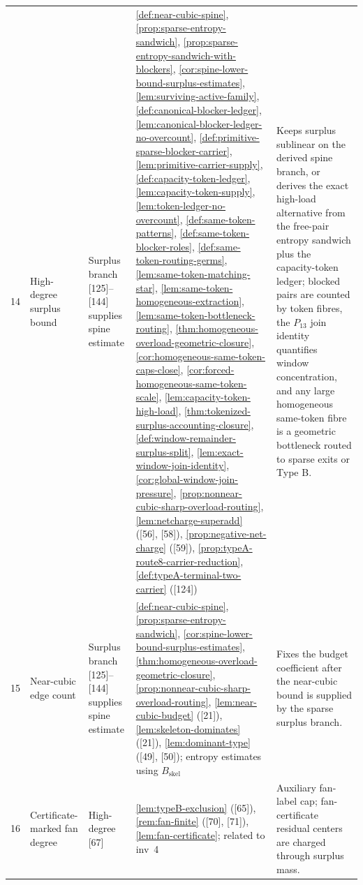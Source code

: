\documentclass[11pt]{article}
\begin{document}
{\begin{longtable}{C{0.032\textwidth} L{0.145\textwidth} L{0.105\textwidth} L{0.50\textwidth} L{0.155\textwidth}}
14 & High-degree surplus bound & Surplus branch {[125]--[144]} supplies spine estimate & \cref{def:near-cubic-spine}, \cref{prop:sparse-entropy-sandwich}, \cref{prop:sparse-entropy-sandwich-with-blockers}, \cref{cor:spine-lower-bound-surplus-estimates}, \cref{lem:surviving-active-family}, \cref{def:canonical-blocker-ledger}, \cref{lem:canonical-blocker-ledger-no-overcount}, \cref{def:primitive-sparse-blocker-carrier}, \cref{lem:primitive-carrier-supply}, \cref{def:capacity-token-ledger}, \cref{lem:capacity-token-supply}, \cref{lem:token-ledger-no-overcount}, \cref{def:same-token-patterns}, \cref{def:same-token-blocker-roles}, \cref{def:same-token-routing-germs}, \cref{lem:same-token-matching-star}, \cref{lem:same-token-homogeneous-extraction}, \cref{lem:same-token-bottleneck-routing}, \cref{thm:homogeneous-overload-geometric-closure}, \cref{cor:homogeneous-same-token-caps-close}, \cref{cor:forced-homogeneous-same-token-scale}, \cref{lem:capacity-token-high-load}, \cref{thm:tokenized-surplus-accounting-closure}, \cref{def:window-remainder-surplus-split}, \cref{lem:exact-window-join-identity}, \cref{cor:global-window-join-pressure}, \cref{prop:nonnear-cubic-sharp-overload-routing}, \cref{lem:netcharge-superadd} ([56], [58]), \cref{prop:negative-net-charge} ([59]), \cref{prop:typeA-route8-carrier-reduction}, \cref{def:typeA-terminal-two-carrier} ([124]) & Keeps surplus sublinear on the derived spine branch, or derives the exact high-load alternative from the free-pair entropy sandwich plus the capacity-token ledger; blocked pairs are counted by token fibres, the \(P_{13}\) join identity quantifies window concentration, and any large homogeneous same-token fibre is a geometric bottleneck routed to sparse exits or Type B. \\
15 & Near-cubic edge count & Surplus branch {[125]--[144]} supplies spine estimate & \cref{def:near-cubic-spine}, \cref{prop:sparse-entropy-sandwich}, \cref{cor:spine-lower-bound-surplus-estimates}, \cref{thm:homogeneous-overload-geometric-closure}, \cref{prop:nonnear-cubic-sharp-overload-routing}, \cref{lem:near-cubic-budget} ([21]), \cref{lem:skeleton-dominates} ([21]), \cref{lem:dominant-type} ([49], [50]); entropy estimates using $B_{\mathrm{skel}}$ & Fixes the budget coefficient after the near-cubic bound is supplied by the sparse surplus branch. \\
16 & Certificate-marked fan degree & High-degree {[67]} & \cref{lem:typeB-exclusion} ([65]), \cref{rem:fan-finite} ([70], [71]), \cref{lem:fan-certificate}; related to inv~4 & Auxiliary fan-label cap; fan-certificate residual centers are charged through surplus mass. \\

\end{longtable}}
\end{document}

